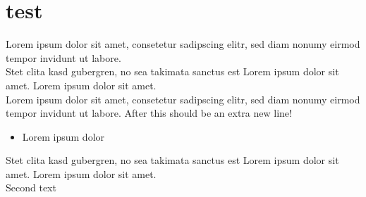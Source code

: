 \documentclass[11pt]{article}
\begin{document}
\tableofcontents
\newpage

\section{test}
Lorem ipsum dolor sit amet, consetetur sadipscing elitr, sed diam nonumy eirmod tempor invidunt ut labore.\\Stet clita kasd gubergren, no sea takimata sanctus est Lorem ipsum dolor sit amet. Lorem ipsum dolor sit amet.\\Lorem ipsum dolor sit amet, consetetur sadipscing elitr, sed diam nonumy eirmod tempor invidunt ut labore. After this should be an extra new line!\begin{itemize}\item Lorem ipsum dolor\end{itemize}Stet clita kasd gubergren, no sea takimata sanctus est Lorem ipsum dolor sit amet. Lorem ipsum dolor sit amet.\\

Second text\\
\end{document}
